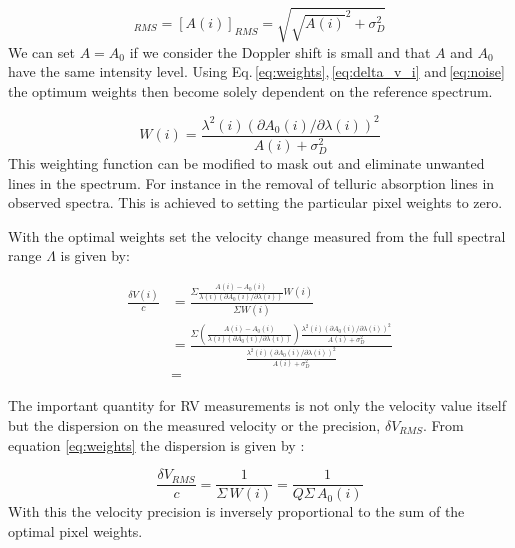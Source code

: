 \begin{equation}
[A(i)-A_0(i)]_{RMS} = [A(i)]_{RMS} = \sqrt{\sqrt{A(i)}^2 + \sigma^2_{D}} \label{eq:noise}
\end{equation}
We can set \(A = A_0\) if we consider the Doppler shift is small and that \(A\) and \(A_0\) have the same intensity level. Using Eq.\,\ref{eq:weights},\,\ref{eq:delta_v_i} and\,\ref{eq:noise}	the optimum weights then become solely dependent on the reference  spectrum.



\begin{equation}
W(i) =   \frac{\lambda^2(i)  (\partial A_0(i)/\partial \lambda(i))^{2}}{A(i) + {\sigma}^{2}_{D}} \label{eq:optimal_weight}
\end{equation}
This weighting function can be modified to mask out and eliminate unwanted lines in the spectrum. For instance in the removal of telluric absorption lines in observed spectra. This is achieved to setting the particular pixel weights to zero.

With the optimal weights set the velocity change measured from the full spectral range \(\Lambda\) is given by:


\begin{eqnarray}
    \frac{\delta V(i)}{c} &= \frac{
    	\Sigma{
        	\frac{
            	A(i) - A_0(i)}{
                \lambda(i) \left(\partial A_0(i)/\partial \lambda(i)\right)} W(i)}}{
             \Sigma {W(i)}} \\
    &= \frac{
    	\Sigma  {
        	(\frac
            	{A(i) - A_0(i)}
                {\lambda(i) (\partial A_0(i)/\partial \lambda(i))}) \frac
                	{\lambda^2(i)  (\partial A_0(i)/\partial \lambda(i))^{2}}
                    {A(i) + {\sigma}^{2}_{D}}
                 }
         }
    {\frac
    	{\lambda^2(i)  (\partial A_0(i)/\partial \lambda(i))^{2}}{A(i) + {\sigma}^{2}_{D}}
        } \\
    &=
    \label{eq:delta_v_eqarray}
\end{eqnarray}

The important quantity for RV measurements is not only the velocity value itself but the dispersion on the measured velocity or the precision, \(\delta V_{RMS}\). From equation \ref{eq:weights} the dispersion is given by :


\begin{equation}
    \frac{\delta V_{RMS}}{c} = \frac{1}{\Sigma {\,W(i)}} = \frac{1}{Q \Sigma {\,A_0(i)}}
\end{equation}
With this the velocity precision is  inversely proportional to the sum of the optimal pixel weights.

